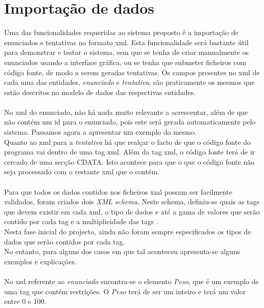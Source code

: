 \section{Importação de dados}\label{sec xml}

Uma das funcionalidades requeridas ao sistema proposto é a importação de enunciados e tentativas no formato xml.
Esta funcionalidade será bastante útil para demonstrar e testar o sistema, sem que se tenha de criar manualmente os enunciados
 usando a interface gráfica, ou se tenha que submeter ficheiros com código fonte, de modo a serem geradas tentativas.
Os campos presentes no xml de cada uma das entidades, \textit{enunciado} e \textit{tentativa}, são praticamente os mesmos 
que estão descritos no modelo de dados das respectivas entidades.\\
\\
No xml do enunciado, não há nada muito relevante a acrescentar, além de que não contém um id para o enunciado, pois este será gerada 
automaticamente pelo sistema. Passamos agora a apresentar um exemplo do mesmo.
\\



Quanto ao xml para a \textit{tentativa} há que realçar o facto de que o código fonte do programa vai dentro de uma tag xml. Além da tag xml, o código fonte
terá de ir cercado de uma secção CDATA. Isto acontece para que o que o código fonte não seja processado com o restante xml que o contém.\\
\\




Para que todos os dados contidos nos ficheiros xml possam ser facilmente validados, foram criados dois \textit{XML schema}.
Neste schema, definiu-se quais as tags que devem existir em cada xml, o tipo de dados e até a gama de valores que serão contido por cada tag e
 a multiplicidade das tags .\\

Nesta fase inicial do projecto, ainda não foram sempre especificados os tipos de dados que serão contidos por cada tag.\\
No entanto, para alguns dos casos em que tal aconteceu apresenta-se alguns exemplos e explicações.\\
\\
No xsd referente ao \textit{enunciado} encontra-se o elemento \textit{Peso}, que é um exemplo de uma tag que contém restrições.
O \textit{Peso} terá de ser um inteiro e terá um valor entre 0 e 100.

